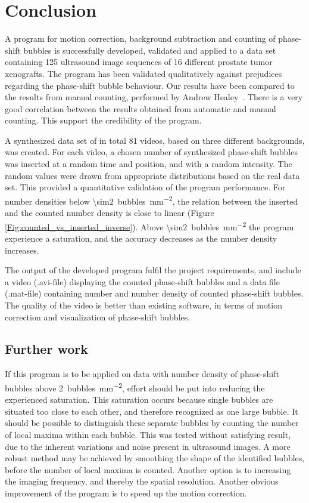 
\section{Conclusion}
A program for motion correction, background subtraction and counting of phase-shift bubbles is successfully developed, validated and applied to a data set containing 125 ultrasound image sequences of 16 different prostate tumor xenografts. The program has been validated qualitatively against prejudices regarding the phase-shift bubble behaviour. Our results have been compared to the results from manual counting, performed by Andrew Healey~\cite{2014}. There is a very good correlation between the results obtained from automatic and manual counting. This support the credibility of the program.

A synthesized data set of in total 81 videos, based on three different backgrounds, was created. For each video, a chosen number of synthesized phase-shift bubbles was inserted at a random time and position, and with a random intensity. The random values were drawn from appropriate distributions based on the real data set. This provided a quantitative validation of the program performance. For number densities below \SI{\sim2}{bubbles\per\milli\meter\squared}, the relation between the inserted and the counted number density is close to linear (Figure \ref{Fig:counted_vs_inserted_inverse}). Above \SI{\sim2}{bubbles\per\milli\meter\squared} the program experience a saturation, and the accuracy decreases as the number density increases. 

The output of the developed program fulfil the project requirements, and include a video (.avi-file) displaying the counted phase-shift bubbles and a data file (.mat-file) containing number and number density of counted phase-shift bubbles. The quality of the video is better than existing software, in terms of motion correction and visualization of phase-shift bubbles.


\subsection{Further work}
If this program is to be applied on data with number density of phase-shift bubbles above \SI{2}{bubbles\per\milli\meter\squared}, effort should be put into reducing the experienced saturation. This saturation occurs because single bubbles are situated too close to each other, and therefore recognized as one large bubble. It should be possible to distinguish these separate bubbles by counting the number of local maxima within each bubble. This was tested without satisfying result, due to the inherent variations and noise present in ultrasound images. A more robust method may be achieved by smoothing the shape of the identified bubbles, before the number of local maxima is counted. Another option is to increasing the imaging frequency, and thereby the spatial resolution. Another obvious improvement of the program is to speed up the motion correction.
	
